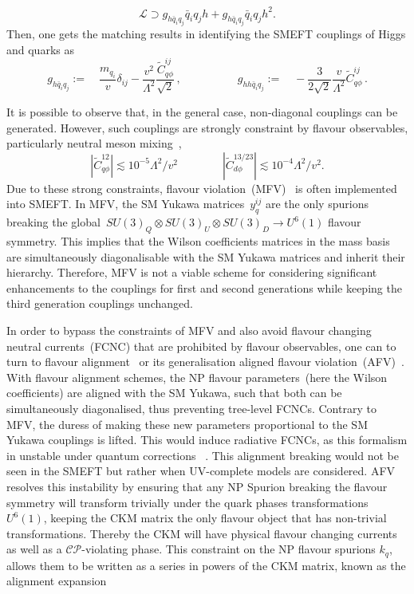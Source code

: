 \begin{equation}
	\mathcal{L}\supset g_{h\bar{q}_i q_j}\bar{q}_i q_j h + g_{h\bar{q}_i q_j}\bar{q}_i q_j h^2.
\end{equation}
Then, one gets the matching results in identifying the SMEFT couplings of Higgs and quarks as
\begin{equation}
	g_{h\bar{q}_i q_j} := \quad \frac{m_{q_i}}{v}\delta_{ij}-\frac{v^2}{\Lambda^2} \frac{	\tilde{C}_{q \phi}^{ij}}{\sqrt{2}}\,, \quad \quad \quad \quad \quad g_{h h\bar{q}_i q_j} := \quad -\frac{3}{2\sqrt{2}}\frac{v}{\Lambda^2}	\tilde{C}_{q \phi}^{ij}\,. \label{eq:couplingsEFT}
\end{equation}
\par It is possible to observe that, in the general case,  non-diagonal couplings can be generated. However, such couplings are strongly constraint by flavour observables, particularly neutral meson mixing~\cite{Blankenburg:2012ex},
\begin{equation}
	|\tilde{C}_{q\phi}^{12}| \lesssim 10^{-5} \Lambda^2/v^2 \quad \quad  \quad \quad | \tilde{C}_{d\phi}^{13/23}| \lesssim 10^{-4} \Lambda^2/v^2.
\end{equation}
Due to these strong constraints, flavour violation~(MFV)~\cite{DAmbrosio:2002vsn} is often implemented into SMEFT. In MFV, the SM Yukawa matrices~$y_q^{ij}$ are the only spurions breaking the global~$SU(3)_Q \otimes SU(3)_U \otimes SU(3)_D \to U^6(1)$ flavour symmetry. This implies that the Wilson coefficients matrices in the mass basis are simultaneously diagonalisable with the SM Yukawa matrices and inherit their hierarchy.  Therefore,  MFV is not a viable scheme for considering significant enhancements to the couplings for first and second generations while keeping the third generation couplings unchanged. 
\par In order to bypass the constraints of MFV and also avoid flavour changing neutral currents~(FCNC) that are prohibited by flavour observables, one can to turn to flavour alignment~\cite{Pich:2009sp,Pich:2010ic} or its generalisation aligned flavour violation~(AFV)~\cite{Egana-Ugrinovic:2018znw}. 
With flavour alignment schemes, the NP flavour parameters~(here the Wilson coefficients) are aligned with the SM Yukawa, such that both can be simultaneously diagonalised, thus preventing tree-level FCNCs.  Contrary to MFV, the duress of making these new parameters proportional to the SM Yukawa couplings is lifted. This would induce radiative FCNCs, as this formalism in unstable under quantum corrections ~\cite{Ferreira:2010xe,Jung:2010ik,Botella:2015yfa}. This alignment breaking would not be seen in the SMEFT but rather when UV-complete models are considered. AFV resolves this instability by ensuring that any NP Spurion breaking the flavour symmetry will transform trivially under the quark phases transformations $ U^6(1)$, keeping the CKM matrix the only flavour object that has non-trivial transformations. Thereby the CKM will have physical flavour changing currents as well as a $\mathcal{CP}$-violating phase. This constraint on the NP flavour spurions $k_q$, allows them to be written as a series in powers of the CKM matrix, known as the alignment expansion
